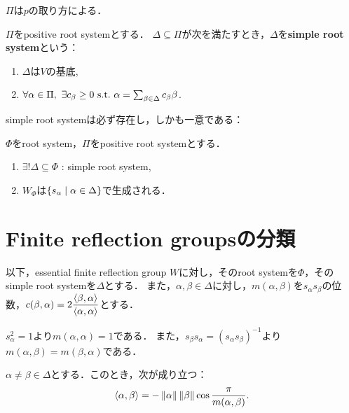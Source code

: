 \begin{remark}
  $\Pi$は$p$の取り方による．
\end{remark}

\begin{definition}
  $\Pi$をpositive root systemとする．
  $\Delta \subseteq \Pi$が次を満たすとき，$\Delta$を\textbf{simple root system}という：
  \begin{enumerate}[label=(\roman*)]
    \item $\Delta$は$V$の基底,
    \item $\forall \alpha \in \Pi,\ \exists c_\beta \ge 0 \ \text{s.t.}\  \alpha = \sum_{\beta \in \Delta} c_\beta \beta$.
  \end{enumerate}
\end{definition}

simple root systemは必ず存在し，しかも一意である：

\begin{fact}
  $\Phi$をroot system，$\Pi$をpositive root systemとする．
  \begin{enumerate}[label=(\arabic*)]
    \item $\exists! \Delta \subseteq \Phi$ : simple root system,
    \item $W_\Phi$は$\left\lbrace s_\alpha \mathrel{} \middle| \mathrel{} \alpha \in \Delta \right\rbrace$で生成される．
  \end{enumerate}
\end{fact}

\section{Finite reflection groupsの分類}
以下，essential finite reflection group $W$に対し，そのroot systemを$\Phi$，そのsimple root systemを$\Delta$とする．
また，$\alpha, \beta \in \Delta$に対し，$m(\alpha, \beta)$を$s_\alpha s_\beta$の位数，$c(\beta, \alpha) = 2\dfrac{\left\langle \beta, \alpha \right\rangle}{\left\langle \alpha, \alpha \right\rangle}$とする．

\begin{remark}
  $s_\alpha^2 = 1$より$m(\alpha, \alpha) = 1$である．
  また，$s_\beta s_\alpha = (s_\alpha s_\beta)^{-1}$より$m(\alpha, \beta) = m(\beta, \alpha)$である．
\end{remark}


\begin{lemma}
  \label{lem:inner_order}
  $\alpha \ne \beta \in \Delta$とする．このとき，次が成り立つ：
  \begin{equation}
    \left\langle \alpha, \beta \right\rangle
    = -\left\| \alpha \right\| \left\| \beta \right\| \cos\frac{\pi}{m(\alpha, \beta)}.
  \end{equation}
\end{lemma}

